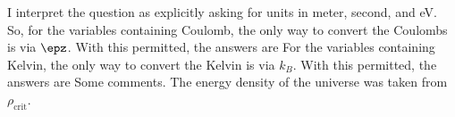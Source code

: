 \documentclass{article}
\begin{document}
I interpret the question as explicitly asking for units in meter, second, and eV. So, for the variables containing Coulomb, the only way to convert the Coulombs is via $\epz$. With this permitted, the answers are
For the variables containing Kelvin, the only way to convert the Kelvin is via $k_B$. With this permitted, the answers are
Some comments.
The energy density of the universe was taken from $\rho_\textrm{crit}$.
\end{document}
